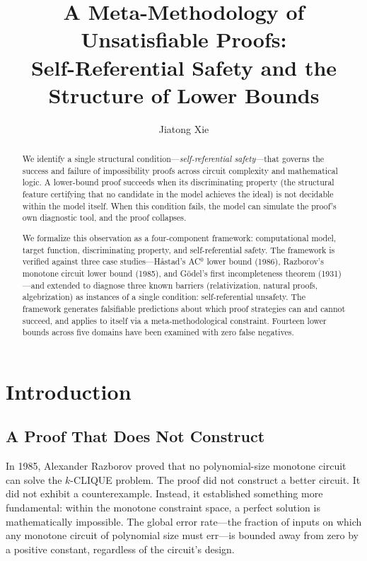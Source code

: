 \documentclass[11pt,a4paper]{article}
\title{A Meta-Methodology of Unsatisfiable Proofs:\\Self-Referential Safety and the Structure of Lower Bounds}
\author{Jiatong Xie}
\date{}
\theoremstyle{plain}
\theoremstyle{definition}
\theoremstyle{remark}
\begin{document}
\maketitle

\begin{abstract}
We identify a single structural condition---\emph{self-referential safety}---that governs the success and failure of impossibility proofs across circuit complexity and mathematical logic. A lower-bound proof succeeds when its discriminating property (the structural feature certifying that no candidate in the model achieves the ideal) is not decidable within the model itself. When this condition fails, the model can simulate the proof's own diagnostic tool, and the proof collapses.

We formalize this observation as a four-component framework: computational model, target function, discriminating property, and self-referential safety. The framework is verified against three case studies---H\r{a}stad's AC$^0$ lower bound (1986), Razborov's monotone circuit lower bound (1985), and G\"{o}del's first incompleteness theorem (1931)---and extended to diagnose three known barriers (relativization, natural proofs, algebrization) as instances of a single condition: self-referential unsafety. The framework generates falsifiable predictions about which proof strategies can and cannot succeed, and applies to itself via a meta-methodological constraint. Fourteen lower bounds across five domains have been examined with zero false negatives.
\end{abstract}

\section{Introduction}
\label{sec:intro}

\subsection{A Proof That Does Not Construct}

In 1985, Alexander Razborov proved that no polynomial-size monotone circuit can solve the $k$-CLIQUE problem. The proof did not construct a better circuit. It did not exhibit a counterexample. Instead, it established something more fundamental: within the monotone constraint space, a perfect solution is mathematically impossible. The global error rate---the fraction of inputs on which any monotone circuit of polynomial size must err---is bounded away from zero by a positive constant, regardless of the circuit's design.
\end{document}
